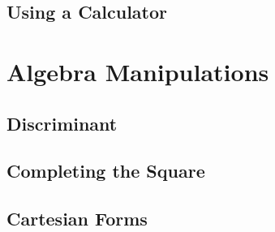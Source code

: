 \subsection{Using a Calculator}

\newpage
\section{Algebra Manipulations}
\noindent{}
\subsection{Discriminant}
\subsection{Completing the Square}
\subsection{Cartesian Forms}
